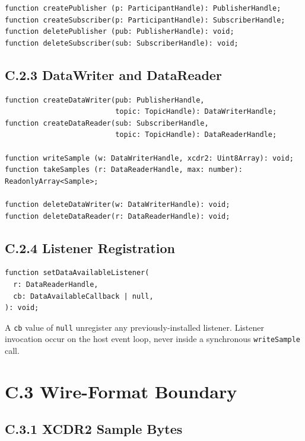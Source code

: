 \documentclass{../styles/zerodds-vendor-spec}
\begin{document}
\begin{lstlisting}
function createPublisher (p: ParticipantHandle): PublisherHandle;
function createSubscriber(p: ParticipantHandle): SubscriberHandle;
function deletePublisher (pub: PublisherHandle): void;
function deleteSubscriber(sub: SubscriberHandle): void;
\end{lstlisting}

\subsection*{C.2.3 DataWriter and DataReader}

\begin{lstlisting}
function createDataWriter(pub: PublisherHandle,
                          topic: TopicHandle): DataWriterHandle;
function createDataReader(sub: SubscriberHandle,
                          topic: TopicHandle): DataReaderHandle;

function writeSample (w: DataWriterHandle, xcdr2: Uint8Array): void;
function takeSamples (r: DataReaderHandle, max: number): ReadonlyArray<Sample>;

function deleteDataWriter(w: DataWriterHandle): void;
function deleteDataReader(r: DataReaderHandle): void;
\end{lstlisting}

\subsection*{C.2.4 Listener Registration}

\begin{lstlisting}
function setDataAvailableListener(
  r: DataReaderHandle,
  cb: DataAvailableCallback | null,
): void;
\end{lstlisting}

A \texttt{cb} value of \texttt{null}  unregister any
previously-installed listener. Listener invocation 
occur on the host event loop, never inside a synchronous
\texttt{writeSample} call.

\section*{C.3 Wire-Format Boundary}

\subsection*{C.3.1 XCDR2 Sample Bytes}
\end{document}
